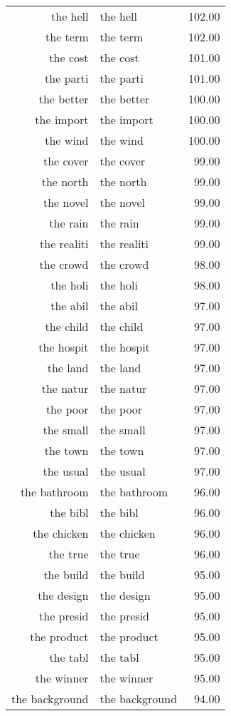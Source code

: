 \begin{table}[ht]
\begin{tabular}{rlr}
  the hell & the hell & 102.00 \\ 
  the term & the term & 102.00 \\ 
  the cost & the cost & 101.00 \\ 
  the parti & the parti & 101.00 \\ 
  the better & the better & 100.00 \\ 
  the import & the import & 100.00 \\ 
  the wind & the wind & 100.00 \\ 
  the cover & the cover & 99.00 \\ 
  the north & the north & 99.00 \\ 
  the novel & the novel & 99.00 \\ 
  the rain & the rain & 99.00 \\ 
  the realiti & the realiti & 99.00 \\ 
  the crowd & the crowd & 98.00 \\ 
  the holi & the holi & 98.00 \\ 
  the abil & the abil & 97.00 \\ 
  the child & the child & 97.00 \\ 
  the hospit & the hospit & 97.00 \\ 
  the land & the land & 97.00 \\ 
  the natur & the natur & 97.00 \\ 
  the poor & the poor & 97.00 \\ 
  the small & the small & 97.00 \\ 
  the town & the town & 97.00 \\ 
  the usual & the usual & 97.00 \\ 
  the bathroom & the bathroom & 96.00 \\ 
  the bibl & the bibl & 96.00 \\ 
  the chicken & the chicken & 96.00 \\ 
  the true & the true & 96.00 \\ 
  the build & the build & 95.00 \\ 
  the design & the design & 95.00 \\ 
  the presid & the presid & 95.00 \\ 
  the product & the product & 95.00 \\ 
  the tabl & the tabl & 95.00 \\ 
  the winner & the winner & 95.00 \\ 
  the background & the background & 94.00 \\ 

\end{tabular}
\end{table}
